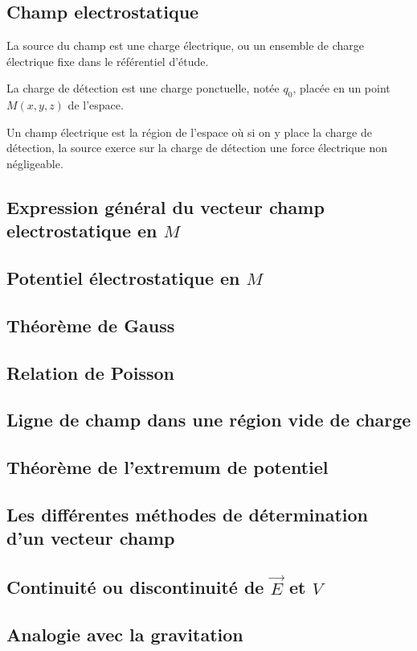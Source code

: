 \documentclass[lecture.tex]{subfiles}
\begin{document}
\subsection{Champ electrostatique}

\begin{definition}
  La source du champ est une charge électrique, ou un ensemble de charge électrique fixe dans le référentiel d'étude.
\end{definition}

\begin{definition}
  La charge de détection est une charge ponctuelle, notée $q_0$, placée en un point $M(x,y,z)$ de l'espace.
\end{definition}

\begin{definition}
  Un champ électrique est la région de l'espace où si on y place la charge de détection, la source exerce sur la charge de détection une force électrique non négligeable.
\end{definition}

\medskip

\subsection{Expression général du vecteur champ electrostatique en $M$}

\subsection{Potentiel électrostatique en $M$}

\subsection{Théorème de Gauss}

\subsection{Relation de Poisson}

\subsection{Ligne de champ dans une région vide de charge}

\subsection{Théorème de l'extremum de potentiel}

\subsection{Les différentes méthodes de détermination d'un vecteur champ}

\subsection{Continuité ou discontinuité de $\vec{E}$ et $V$}

\subsection{Analogie avec la gravitation}
\end{document}
